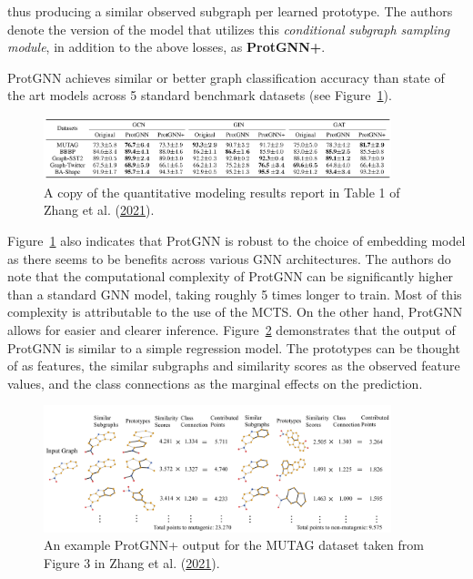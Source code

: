 \documentclass[
  11pt,
  letterpaper,
]{article}
\begin{document}
thus producing a similar observed subgraph per learned prototype. The
authors denote the version of the model that utilizes this
\emph{conditional subgraph sampling module}, in addition to the above
losses, as \textbf{ProtGNN+}.

\quad ProtGNN achieves similar or better graph classification accuracy
than state of the art models across 5 standard benchmark datasets (see
Figure~\ref{fig-prot-acc-table}).

\begin{figure}

{\centering \includegraphics[width=0.9\textwidth,height=\textheight]{figures/prot_acc_table.png}

}

\caption{\label{fig-prot-acc-table}A copy of the quantitative modeling
results report in Table 1 of Zhang et al.
(\protect\hyperlink{ref-Zhang_Liu_Wang_Lu_Lee_2021}{2021}).}

\end{figure}

Figure~\ref{fig-prot-acc-table} also indicates that ProtGNN is robust to
the choice of embedding model as there seems to be benefits across
various GNN architectures. The authors do note that the computational
complexity of ProtGNN can be significantly higher than a standard GNN
model, taking roughly 5 times longer to train. Most of this complexity
is attributable to the use of the MCTS. On the other hand, ProtGNN
allows for easier and clearer inference. Figure~\ref{fig-prot-diagram}
demonstrates that the output of ProtGNN is similar to a simple
regression model. The prototypes can be thought of as features, the
similar subgraphs and similarity scores as the observed feature values,
and the class connections as the marginal effects on the prediction.

\begin{figure}

{\centering \includegraphics[width=0.9\textwidth,height=\textheight]{figures/prot_inference_ex.png}

}

\caption{\label{fig-prot-diagram}An example ProtGNN+ output for the
MUTAG dataset taken from Figure 3 in Zhang et al.
(\protect\hyperlink{ref-Zhang_Liu_Wang_Lu_Lee_2021}{2021}).}

\end{figure}
\end{document}

